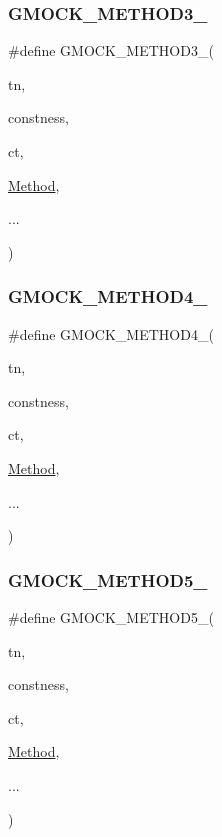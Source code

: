 \subsubsection{\texorpdfstring{GMOCK\_METHOD3\_}{GMOCK\_METHOD3\_}}
{\footnotesize\ttfamily \#define G\+M\+O\+C\+K\+\_\+\+M\+E\+T\+H\+O\+D3\+\_\+(\begin{DoxyParamCaption}\item[{}]{tn,  }\item[{}]{constness,  }\item[{}]{ct,  }\item[{}]{\mbox{\hyperlink{gmock-spec-builders__test_8cc_a95606368148f3e5aab5db46c32466afd}{Method}},  }\item[{}]{... }\end{DoxyParamCaption})}

\mbox{\label{gmock-generated-function-mockers_8h_ab6430f2cfad9de4aca5258ea559294bb}} 
\subsubsection{\texorpdfstring{GMOCK\_METHOD4\_}{GMOCK\_METHOD4\_}}
{\footnotesize\ttfamily \#define G\+M\+O\+C\+K\+\_\+\+M\+E\+T\+H\+O\+D4\+\_\+(\begin{DoxyParamCaption}\item[{}]{tn,  }\item[{}]{constness,  }\item[{}]{ct,  }\item[{}]{\mbox{\hyperlink{gmock-spec-builders__test_8cc_a95606368148f3e5aab5db46c32466afd}{Method}},  }\item[{}]{... }\end{DoxyParamCaption})}

\mbox{\label{gmock-generated-function-mockers_8h_a9e3ecd392499ab19a4a6d3adcabf56f6}} 
\subsubsection{\texorpdfstring{GMOCK\_METHOD5\_}{GMOCK\_METHOD5\_}}
{\footnotesize\ttfamily \#define G\+M\+O\+C\+K\+\_\+\+M\+E\+T\+H\+O\+D5\+\_\+(\begin{DoxyParamCaption}\item[{}]{tn,  }\item[{}]{constness,  }\item[{}]{ct,  }\item[{}]{\mbox{\hyperlink{gmock-spec-builders__test_8cc_a95606368148f3e5aab5db46c32466afd}{Method}},  }\item[{}]{... }\end{DoxyParamCaption})}


